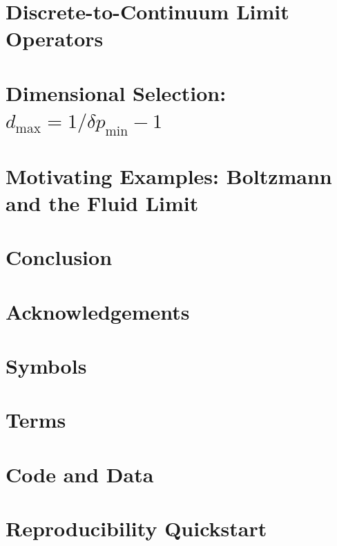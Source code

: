 \documentclass[12pt, letterpaper]{article}
\begin{document}
\section{Discrete-to-Continuum Limit Operators}


\section{Dimensional Selection: $d_{\max} = 1/\delta p_{\min} - 1$}


\section{Motivating Examples: Boltzmann and the Fluid Limit}


\section{Conclusion}


\section*{Acknowledgements}


\appendix

\section{Symbols}


\section{Terms}


\section{Code and Data}


\section{Reproducibility Quickstart}




\end{document}
